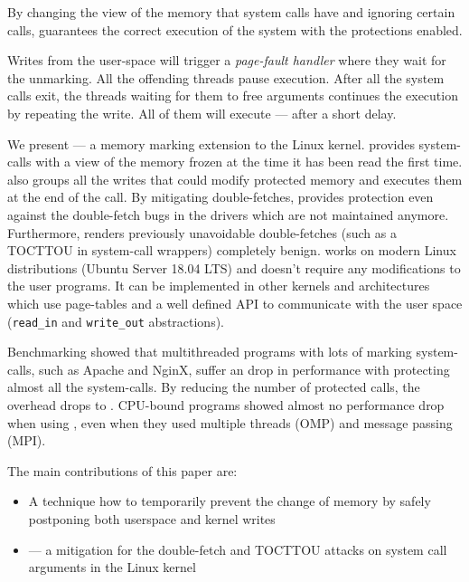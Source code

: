 By changing the view of the memory that system calls have and ignoring certain
calls, \sysname guarantees the correct execution of the system with the
protections enabled.

Writes from the user-space will trigger a \emph{page-fault handler} where they
wait for the unmarking. All the offending threads pause execution.
After all the system calls exit, the threads waiting for them to free arguments
continues the execution by repeating the write. All of them will execute 
--- after a short delay.

We present \sysname --- a memory marking extension to the Linux kernel. \sysname
provides system-calls with a view of the memory frozen at the time it
has been read the first time. \sysname also groups all the writes that could
modify protected memory and executes them at the end of the call. By mitigating
double-fetches, \sysname provides protection even against the double-fetch bugs
in the drivers which are not maintained anymore. Furthermore, \sysname
renders previously unavoidable double-fetches (such as a TOCTTOU in
system-call wrappers) completely benign. \sysname works on modern
Linux distributions (Ubuntu Server 18.04 LTS) and doesn't require any
modifications to the user programs. It can be implemented in other kernels
and architectures which use page-tables and a well defined API to communicate
with the user space (\texttt{read\_in} and \texttt{write\_out} abstractions).

Benchmarking \sysname showed that multithreaded programs with lots of marking
system-calls, such as Apache and NginX, suffer an \roughevaloverheadbad drop in
performance with \sysname protecting almost all the system-calls. By reducing
the number of protected calls, the overhead drops to \roughevaloverheadbetter.
CPU-bound programs showed almost no performance drop when using \sysname, even
when they used multiple threads (OMP) and message passing (MPI).



The main contributions of this paper are:


\begin{itemize}
\item A technique how to temporarily prevent the change of memory by safely
      postponing both userspace and kernel writes
\item \sysname --- a mitigation for the double-fetch and TOCTTOU attacks on system
      call arguments in the Linux kernel
\end{itemize}

